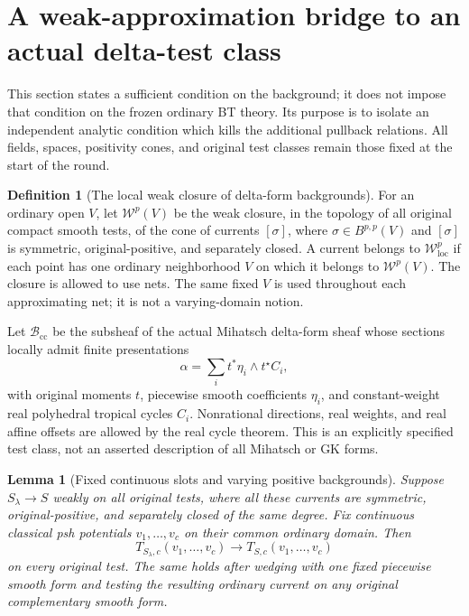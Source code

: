 \documentclass[11pt,a4paper]{article}
\numberwithin{equation}{section}
\newtheorem{lemma}[theorem]{Lemma}
\theoremstyle{definition}
\newtheorem{definition}[theorem]{Definition}
\theoremstyle{remark}
\begin{document}


\section{A weak-approximation bridge to an actual delta-test class}
\label{sec:r6-delta-weak-approximation}

This section states a sufficient condition on the background;
it does not impose that condition on the frozen ordinary BT
theory. Its purpose is to isolate an independent analytic
condition which kills the additional pullback relations.
All fields, spaces, positivity cones, and original test
classes remain those fixed at the start of the round.

\begin{definition}[The local weak closure of delta-form backgrounds]
\label{def:r6-delta-weak-closure}
For an ordinary open $V$, let $\mathcal W^p(V)$ be the weak
closure, in the topology of all original compact smooth
tests, of the cone of currents $[\sigma]$, where
$\sigma\in B^{p,p}(V)$ and $[\sigma]$ is symmetric,
original-positive, and separately closed. A current belongs
to $\mathcal W^p_{\mathrm{loc}}$ if each point has one
ordinary neighborhood $V$ on which it belongs to
$\mathcal W^p(V)$. The closure is allowed to use nets.
The same fixed $V$ is used throughout each approximating
net; it is not a varying-domain notion.

Let $\mathscr B_{\mathrm{cc}}$ be the subsheaf of the actual
Mihatsch delta-form sheaf whose sections locally admit
finite presentations
\[
       \alpha=\sum_i t^*\eta_i\wedge t^\star C_i,
\]
with original moments $t$, piecewise smooth coefficients
$\eta_i$, and constant-weight real polyhedral tropical
cycles $C_i$. Nonrational directions, real weights, and
real affine offsets are allowed by the real cycle theorem.
This is an explicitly specified test class,
not an asserted description of all Mihatsch or GK forms.
\end{definition}

\begin{lemma}[Fixed continuous slots and varying positive backgrounds]
\label{lem:r6-fixed-continuous-slots-varying-background}
Suppose $S_\lambda\to S$ weakly on all original tests, where
all these currents are symmetric, original-positive, and
separately closed of the same degree. Fix continuous
classical psh potentials $v_1,\ldots,v_c$ on their common
ordinary domain. Then
\[
 T_{S_\lambda,c}(v_1,\ldots,v_c)
             \longrightarrow T_{S,c}(v_1,\ldots,v_c)
\]
on every original test. The same holds after wedging with
one fixed piecewise smooth form and testing the resulting
ordinary current on any original complementary smooth form.
\end{lemma}
\end{document}
